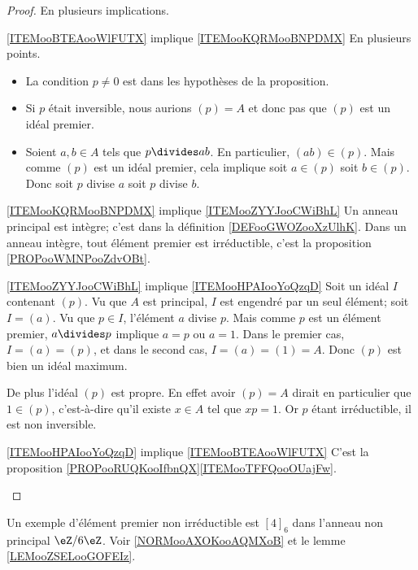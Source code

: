 \begin{proof}
    En plusieurs implications.
    \begin{subproof}
        \item[\ref{ITEMooBTEAooWlFUTX} implique \ref{ITEMooKQRMooBNPDMX}]
            En plusieurs points.
            \begin{itemize}
                \item La condition \( p\neq 0\) est dans les hypothèses de la proposition.
                \item Si \( p\) était inversible, nous aurions \( (p)=A\) et donc pas que \( (p)\) est un idéal premier.
                \item Soient \( a,b\in A\) tels que \( p\divides ab\). En particulier, \( (ab)\in (p)\). Mais comme \( (p)\) est un idéal premier, cela implique soit \( a\in (p)\) soit \( b\in (p)\). Donc soit \( p\) divise \( a\) soit \( p\) divise \( b\).
            \end{itemize}
        \item[\ref{ITEMooKQRMooBNPDMX} implique \ref{ITEMooZYYJooCWiBhL}]
            Un anneau principal est intègre; c'est dans la définition \ref{DEFooGWOZooXzUlhK}. Dans un anneau intègre, tout élément premier est irréductible, c'est la proposition \ref{PROPooWMNPooZdvOBt}.
        \item[\ref{ITEMooZYYJooCWiBhL} implique \ref{ITEMooHPAIooYoQzqD}]
            Soit un idéal \( I\) contenant \( (p)\). Vu que \( A\) est principal, \( I\) est engendré par un seul élément; soit \( I=(a)\). Vu que \( p\in I\), l'élément \( a\) divise \( p\). Mais comme \( p\) est un élément premier, \( a\divides p\) implique \( a=p\) ou \( a=1\). Dans le premier cas, \( I=(a)=(p)\), et dans le second cas, \( I=(a)=(1)=A\). Donc \( (p)\) est bien un idéal maximum.

            De plus l'idéal \( (p)\) est propre. En effet avoir \( (p)=A\) dirait en particulier que \( 1\in (p)\), c'est-à-dire qu'il existe \( x\in A\) tel que \( xp=1\). Or \( p\) étant irréductible, il est non inversible.
        \item[\ref{ITEMooHPAIooYoQzqD} implique \ref{ITEMooBTEAooWlFUTX}]
            C'est la proposition \ref{PROPooRUQKooIfbnQX}\ref{ITEMooTFFQooOUajFw}.
    \end{subproof}
\end{proof}

Un exemple d'élément premier non irréductible est \( [4]_6\) dans l'anneau non principal \( \eZ/6\eZ\). Voir \ref{NORMooAXOKooAQMXoB} et le lemme \ref{LEMooZSELooGOFEIz}.

